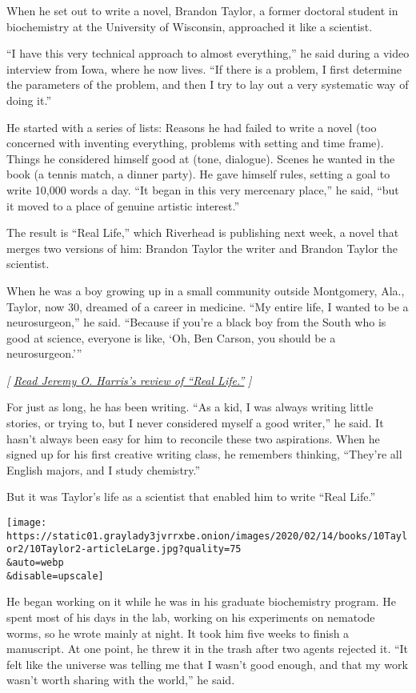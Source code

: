 When he set out to write a novel, Brandon Taylor, a former doctoral
student in biochemistry at the University of Wisconsin, approached it
like a scientist.

``I have this very technical approach to almost everything,'' he said
during a video interview from Iowa, where he now lives. ``If there is a
problem, I first determine the parameters of the problem, and then I try
to lay out a very systematic way of doing it.''

He started with a series of lists: Reasons he had failed to write a
novel (too concerned with inventing everything, problems with setting
and time frame). Things he considered himself good at (tone, dialogue).
Scenes he wanted in the book (a tennis match, a dinner party). He gave
himself rules, setting a goal to write 10,000 words a day. ``It began in
this very mercenary place,'' he said, ``but it moved to a place of
genuine artistic interest.''

The result is ``Real Life,'' which Riverhead is publishing next week, a
novel that merges two versions of him: Brandon Taylor the writer and
Brandon Taylor the scientist.

When he was a boy growing up in a small community outside Montgomery,
Ala., Taylor, now 30, dreamed of a career in medicine. ``My entire life,
I wanted to be a neurosurgeon,'' he said. ``Because if you're a black
boy from the South who is good at science, everyone is like, `Oh, Ben
Carson, you should be a neurosurgeon.'''

\emph{{[}}
\href{https://www.nytimes3xbfgragh.onion/2020/02/18/books/review/brandon-taylor-real-life.html}{\emph{Read
Jeremy O. Harris's review of ``Real Life.''}} \emph{{]}}

For just as long, he has been writing. ``As a kid, I was always writing
little stories, or trying to, but I never considered myself a good
writer,'' he said. It hasn't always been easy for him to reconcile these
two aspirations. When he signed up for his first creative writing class,
he remembers thinking, ``They're all English majors, and I study
chemistry.''

But it was Taylor's life as a scientist that enabled him to write ``Real
Life.''

\texttt{[image: https://static01.graylady3jvrrxbe.onion/images/2020/02/14/books/10Taylor2/10Taylor2-articleLarge.jpg?quality=75\\\&auto=webp\\\&disable=upscale]}

He began working on it while he was in his graduate biochemistry
program. He spent most of his days in the lab, working on his
experiments on nematode worms, so he wrote mainly at night. It took him
five weeks to finish a manuscript. At one point, he threw it in the
trash after two agents rejected it. ``It felt like the universe was
telling me that I wasn't good enough, and that my work wasn't worth
sharing with the world,'' he said.

